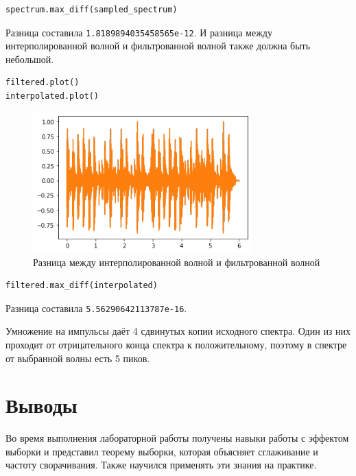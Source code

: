 \documentclass[a4paper,12pt]{report}
\begin{document}
\begin{lstlisting}[caption=Разница между спектром до и после дискретизации]
spectrum.max_diff(sampled_spectrum)
\end{lstlisting}

Разница составила \texttt{1.8189894035458565e-12}. И разница между интерполированной волной и фильтрованной волной также должна быть небольшой.

\begin{lstlisting}[caption=Разница между интерполированной волной и фильтрованной волной]
filtered.plot()
interpolated.plot()
\end{lstlisting}

\begin{figure}[H]
        \centering
        \includegraphics[width=0.75\textwidth]{lab11_fig3_7.png}
        \caption{Разница между интерполированной волной и фильтрованной волной}
        \label{fig:lab11_fig3_7}
\end{figure}

\begin{lstlisting}[caption=Разница между интерполированной волной и фильтрованной волной]
filtered.max_diff(interpolated)
\end{lstlisting}

Разница составила \texttt{5.56290642113787e-16}.

Умножение на импульсы даёт 4 сдвинутых копии исходного спектра. Один из них проходит от отрицательного конца спектра к положительному, поэтому в спектре от выбранной волны есть 5 пиков.

\chapter{Выводы}

Во время выполнения лабораторной работы получены навыки работы с эффектом выборки и представил теорему выборки, которая объясняет сглаживание и частоту сворачивания. Также научился применять эти знания на практике.
\end{document}
